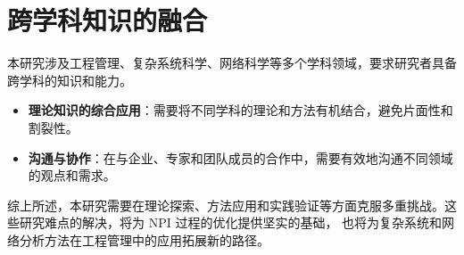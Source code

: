 \section{跨学科知识的融合}

本研究涉及工程管理、复杂系统科学、网络科学等多个学科领域，要求研究者具备跨学科的知识和能力。

\begin{itemize}
  \item \textbf{理论知识的综合应用}：需要将不同学科的理论和方法有机结合，避免片面性和割裂性\citep{rhee2000complex}。
  
  \item \textbf{沟通与协作}：在与企业、专家和团队成员的合作中，需要有效地沟通不同领域的观点和需求\citep{lattuca2001creating}。
\end{itemize}

综上所述，本研究需要在理论探索、方法应用和实践验证等方面克服多重挑战。这些研究难点的解决，将为 NPI 过程的优化提供坚实的基础，
也将为复杂系统和网络分析方法在工程管理中的应用拓展新的路径。